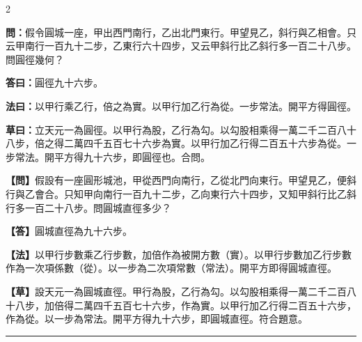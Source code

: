 \documentclass[11pt,a4paper]{article}
\newcommand{\longline}{\noindent\rule{\textwidth}{0.4pt}}
\newcommand{\wenC}[1]{\par\noindent\textbf{\textcolor{probcolor}{問：}}{#1}\par}
\newcommand{\daC}[1]{\par\noindent\textbf{\textcolor{anscolor}{答曰：}}{#1}\par}
\newcommand{\fayueC}[1]{\par\noindent\textbf{\textcolor{methodcolor}{法曰：}}{#1}\par}
\newcommand{\caoyueC}[1]{\par\noindent\textbf{草曰：}{#1}\par}
\newcommand{\wenM}[1]{\par\noindent\textbf{\textcolor{probcolor}{【問】}}{#1}\par}
\newcommand{\daM}[1]{\par\noindent\textbf{\textcolor{anscolor}{【答】}}{#1}\par}
\newcommand{\fayueM}[1]{\par\noindent\textbf{\textcolor{methodcolor}{【法】}}{#1}\par}
\newcommand{\caoyueM}[1]{\par\noindent\textbf{【草】}{#1}\par}
\begin{document}
\begin{paracol}{2}

\wenC{假令圓城一座，甲出西門南行，乙出北門東行。甲望見乙，斜行與乙相會。只云甲南行一百九十二步，乙東行六十四步，又云甲斜行比乙斜行多一百二十八步。問圓徑幾何？}

\daC{圓徑九十六步。}

\fayueC{以甲行乘乙行，倍之為實。以甲行加乙行為從。一步常法。開平方得圓徑。}

\caoyueC{立天元一為圓徑。以甲行為股，乙行為勾。以勾股相乘得一萬二千二百八十八步，倍之得二萬四千五百七十六步為實。以甲行加乙行得二百五十六步為從。一步常法。開平方得九十六步，即圓徑也。合問。}

\switchcolumn

\wenM{假設有一座圓形城池，甲從西門向南行，乙從北門向東行。甲望見乙，便斜行與乙會合。只知甲向南行一百九十二步，乙向東行六十四步，又知甲斜行比乙斜行多一百二十八步。問圓城直徑多少？}

\daM{圓城直徑為九十六步。}

\fayueM{以甲行步數乘乙行步數，加倍作為被開方數（實）。以甲行步數加乙行步數作為一次項係數（從）。以一步為二次項常數（常法）。開平方即得圓城直徑。}

\caoyueM{設天元一為圓城直徑。甲行為股，乙行為勾。以勾股相乘得一萬二千二百八十八步，加倍得二萬四千五百七十六步，作為實。以甲行加乙行得二百五十六步，作為從。以一步為常法。開平方得九十六步，即圓城直徑。符合題意。}

\end{paracol}

\vspace{0.3cm}
\longline
\end{document}
